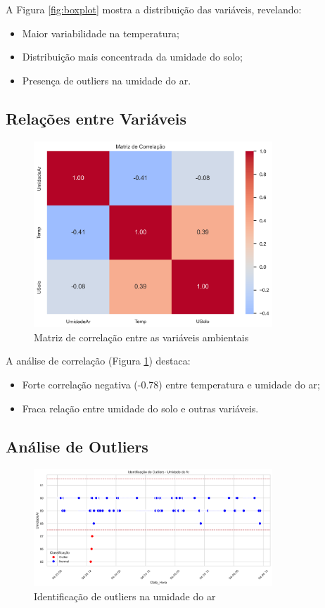 \documentclass[12pt, a4paper]{article}
\begin{document}
A Figura \ref{fig:boxplot} mostra a distribuição das variáveis, revelando:
\begin{itemize}
    \item Maior variabilidade na temperatura;
    \item Distribuição mais concentrada da umidade do solo;
    \item Presença de outliers na umidade do ar.
\end{itemize}

\subsection{Relações entre Variáveis}
\begin{figure}[H]
\centering
\includegraphics[width=0.8\textwidth]{graficos/matriz_correlacao.png}
\caption{Matriz de correlação entre as variáveis ambientais}
\label{fig:correlacao}
\end{figure}

A análise de correlação (Figura \ref{fig:correlacao}) destaca:
\begin{itemize}
    \item Forte correlação negativa (-0.78) entre temperatura e umidade do ar;
    \item Fraca relação entre umidade do solo e outras variáveis.
\end{itemize}

\subsection{Análise de Outliers}
\begin{figure}[H]
\centering
\includegraphics[width=0.8\textwidth]{graficos/outliers_umidade.png}
\caption{Identificação de outliers na umidade do ar}
\label{fig:outliers}
\end{figure}
\end{document}
